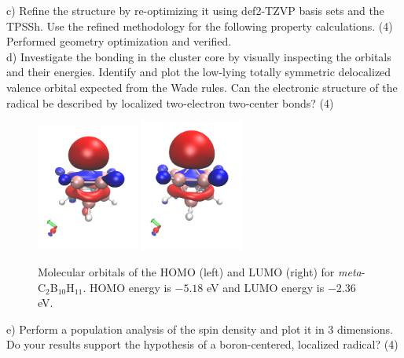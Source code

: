 \documentclass{article}
\begin{document}
\noindent c) Refine the structure by re-optimizing it using def2-TZVP basis
sets and the TPSSh. Use the refined methodology for the following property
calculations. (4)
\\

{\color{blue} Performed geometry optimization and verified.}
\\

\noindent d) Investigate the bonding in the cluster core by visually inspecting
the orbitals and their energies. Identify and plot the low-lying totally symmetric
delocalized valence orbital expected from the Wade rules. Can the electronic
structure of the radical be described by localized two-electron two-center
bonds? (4)

\begin{figure}[H]
  \centering
  \includegraphics[width=0.3\textwidth]{homo_37a_a.png}
  \includegraphics[width=0.3\textwidth]{lumo_37a_b.png}
  \caption{Molecular orbitals of the HOMO (left) and LUMO (right) for
    \textit{meta}-C$_2$B$_{10}$H$_{11}$. HOMO energy is $-5.18$ eV and
    LUMO energy is $-2.36$ eV.}
  \label{fig:orbital}
\end{figure}

\noindent e) Perform a population analysis of the spin density and plot
it in 3 dimensions. Do your results support the hypothesis of a boron-centered,
localized radical? (4)
\end{document}
